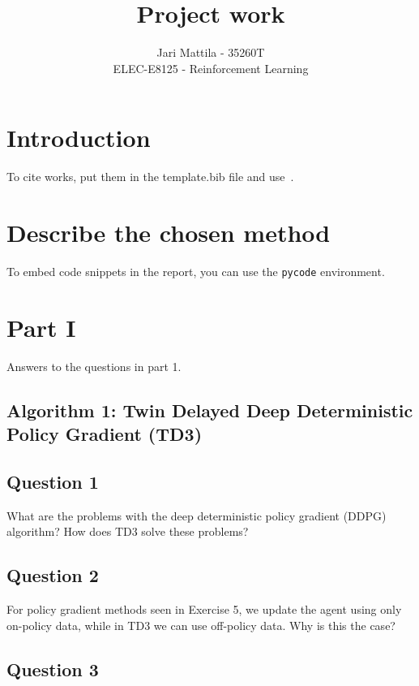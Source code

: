 \documentclass[12pt]{article}
\begin{document}
 
\title{Project work}
\author{Jari Mattila - 35260T\\
ELEC-E8125 - Reinforcement Learning}

\maketitle
\section*{Introduction}

To cite works, put them in the template.bib file and use~\cite{sutton2018reinforcement}.



\section*{Describe the chosen method}
To embed code snippets in the report, you can use the \texttt{pycode} environment.



\section*{Part I}

Answers to the questions in part 1.
\newline

\subsection*{Algorithm 1: Twin Delayed Deep Deterministic Policy Gradient (TD3)}


\subsection*{Question 1}

What are the problems with the deep deterministic policy gradient (DDPG) algorithm? 
How does TD3 solve these problems? 

\subsection*{Question 2}

For policy gradient methods seen in Exercise 5, we update the agent using only on-policy data,
while in TD3 we can use off-policy data. Why is this the case?

\subsection*{Question 3}
\end{document}
